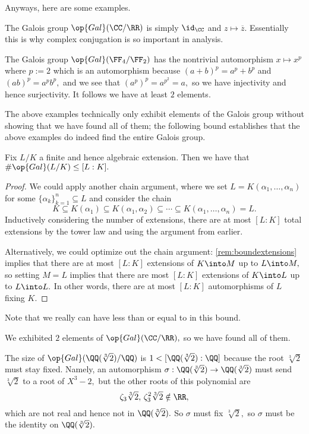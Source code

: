 Anyways, here are some examples.
\begin{example}
	The Galois group $\op{Gal}(\CC/\RR)$ is simply $\id_\CC$ and $z\mapsto\overline z.$ Essentially this is why complex conjugation is so important in analysis.
\end{example}
\begin{example}
	The Galois group $\op{Gal}(\FF_4/\FF_2)$ has the nontrivial automorphism $x\mapsto x^p$ where $p:=2$ which is an automorphism because $(a+b)^p=a^p+b^p$ and $(ab)^p=a^pb^p,$ and we see that $\left(a^p\right)^p=a^{p^2}=a,$ so we have injectivity and hence surjectivity. It follows we have at least $2$ elements.
\end{example}
The above examples technically only exhibit elements of the Galois group without showing that we have found all of them; the following bound establishes that the above examples do indeed find the entire Galois group.
\begin{proposition}
	Fix $L/K$ a finite and hence algebraic extension. Then we have that $\#\op{Gal}(L/K)\le[L:K].$
\end{proposition}
\begin{proof}
	We could apply another chain argument, where we set $L=K(\alpha_1,\ldots,\alpha_n)$ for some $\{\alpha_k\}_{k=1}^n\subseteq L$ and consider the chain
	\[K\subseteq K(\alpha_1)\subseteq K(\alpha_1,\alpha_2)\subseteq\cdots\subseteq K(\alpha_1,\ldots,\alpha_n)=L.\]
	Inductively considering the number of extensions, there are at most $[L:K]$ total extensions by the tower law and using the argument from earlier.

	Alternatively, we could optimize out the chain argument: \autoref{rem:boundextensions} implies that there are at most $[L:K]$ extensions of $K\into M$ up to $L\into M,$ so setting $M=L$ implies that there are most $[L:K]$ extensions of $K\into L$ up to $L\into L.$ In other words, there are at most $[L:K]$ automorphisms of $L$ fixing $K.$
\end{proof}
Note that we really can have less than or equal to in this bound.
\begin{example}
	We exhibited $2$ elements of $\op{Gal}(\CC/\RR),$ so we have found all of them.
\end{example}
\begin{ex}
	The size of $\op{Gal}(\QQ(\sqrt[3]2)/\QQ)$ is $1<[\QQ(\sqrt[3]2):\QQ]$ because the root $\sqrt[3]2$ must stay fixed. Namely, an automorphism $\sigma:\QQ(\sqrt[3]2)\to\QQ(\sqrt[3]2)$ must send $\sqrt[3]2$ to a root of $X^3-2,$ but the other roots of this polynomial are
	\[\zeta_3\sqrt[3]2,\,\zeta_3^2\sqrt[3]2\notin\RR,\]
	which are not real and hence not in $\QQ(\sqrt[3]2).$ So $\sigma$ must fix $\sqrt[3]2,$ so $\sigma$ must be the identity on $\QQ(\sqrt[3]2).$
\end{ex}
